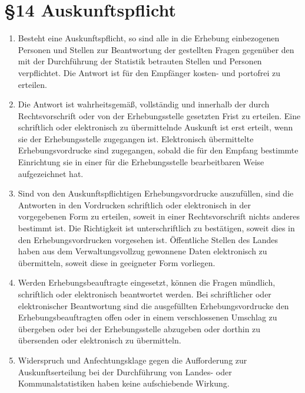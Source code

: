     \section{\S14 Auskunftspflicht}
    \begin{enumerate}[label=(\arabic*)]
        \item Besteht eine Auskunftspflicht, so sind alle in die Erhebung einbezogenen Personen und Stellen zur Beantwortung der gestellten Fragen gegenüber den mit der Durchführung der Statistik betrauten Stellen und Personen verpflichtet. Die Antwort ist für den Empfänger kosten- und portofrei zu erteilen.
        \item Die Antwort ist wahrheitsgemäß, vollständig und innerhalb der durch Rechtsvorschrift oder von der Erhebungsstelle gesetzten Frist zu erteilen. Eine schriftlich oder elektronisch zu übermittelnde Auskunft ist erst erteilt, wenn sie der Erhebungsstelle zugegangen ist. Elektronisch übermittelte Erhebungsvordrucke sind zugegangen, sobald die für den Empfang bestimmte Einrichtung sie in einer für die Erhebungsstelle bearbeitbaren Weise aufgezeichnet hat.
        \item Sind von den Auskunftspflichtigen Erhebungsvordrucke auszufüllen, sind die Antworten in den Vordrucken schriftlich oder elektronisch in der vorgegebenen Form zu erteilen, soweit in einer Rechtsvorschrift nichts anderes bestimmt ist. Die Richtigkeit ist unterschriftlich zu bestätigen, soweit dies in den Erhebungsvordrucken vorgesehen ist. Öffentliche Stellen des Landes haben aus dem Verwaltungsvollzug gewonnene Daten elektronisch zu übermitteln, soweit diese in geeigneter Form vorliegen.
        \item Werden Erhebungsbeauftragte eingesetzt, können die Fragen mündlich, schriftlich oder elektronisch beantwortet werden. Bei schriftlicher oder elektronischer Beantwortung sind die ausgefüllten Erhebungsvordrucke den Erhebungsbeauftragten offen oder in einem verschlossenen Umschlag zu übergeben oder bei der Erhebungsstelle abzugeben oder dorthin zu übersenden oder elektronisch zu übermitteln.
        \item Widerspruch und Anfechtungsklage gegen die Aufforderung zur Auskunftserteilung bei der Durchführung von Landes- oder Kommunalstatistiken haben keine aufschiebende Wirkung.
    \end{enumerate}

